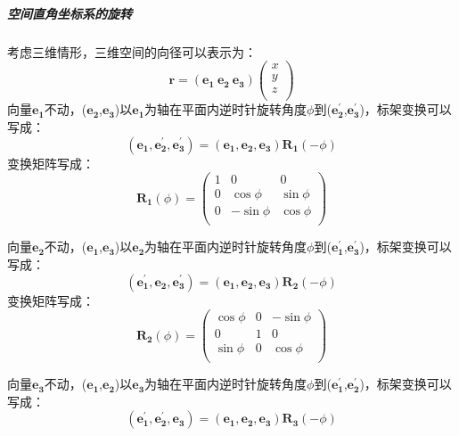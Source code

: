\subparagraph{空间直角坐标系的旋转}
考虑三维情形，三维空间的向径可以表示为：
\begin{equation}
	\boldsymbol{r}=(\boldsymbol{e_{1}} \ \boldsymbol{e_{2}} \ \boldsymbol{e_{3}})\begin{pmatrix}
		x\\
		y\\
		z\\
	\end{pmatrix}
\end{equation}
向量$\boldsymbol{e_{1}}$不动，($\boldsymbol{e_{2}}$,$\boldsymbol{e_{3}}$)以$\boldsymbol{e_{1}}$为轴在平面内逆时针旋转角度$\phi$到($\boldsymbol{e_{2}^\prime}$,$\boldsymbol{e_{3}^\prime}$)，标架变换可以写成：
\begin{equation}
	(\boldsymbol{e_{1}},\boldsymbol{e_{2}^\prime},\boldsymbol{e_{3}^\prime})=(\boldsymbol{e_{1}},\boldsymbol{e_{2}},\boldsymbol{e_{3}})\boldsymbol{R_{1}}(-\phi)
\end{equation}
变换矩阵写成：
\begin{equation}
	\boldsymbol{R_{1}}(\phi)=\begin{pmatrix}
		1&0&0\\
		0&\cos \phi &\sin \phi \\
		0&-\sin \phi &\cos \phi \\
	\end{pmatrix}
\end{equation}

向量$\boldsymbol{e_{2}}$不动，($\boldsymbol{e_{1}}$,$\boldsymbol{e_{3}}$)以$\boldsymbol{e_{2}}$为轴在平面内逆时针旋转角度$\phi$到($\boldsymbol{e_{1}^\prime}$,$\boldsymbol{e_{3}^\prime}$)，标架变换可以写成：
\begin{equation}
	(\boldsymbol{e_{1}^\prime},\boldsymbol{e_{2}},\boldsymbol{e_{3}^\prime})=(\boldsymbol{e_{1}},\boldsymbol{e_{2}},\boldsymbol{e_{3}})\boldsymbol{R_{2}}(-\phi)
\end{equation}
变换矩阵写成：
\begin{equation}
	\boldsymbol{R_{2}}(\phi)=\begin{pmatrix}
		\cos \phi &0&-\sin \phi \\
		0&1&0\\
		\sin \phi &0&\cos \phi \\
	\end{pmatrix}
\end{equation}

向量$\boldsymbol{e_{3}}$不动，($\boldsymbol{e_{1}}$,$\boldsymbol{e_{2}}$)以$\boldsymbol{e_{3}}$为轴在平面内逆时针旋转角度$\phi$到($\boldsymbol{e_{1}^\prime}$,$\boldsymbol{e_{2}^\prime}$)，标架变换可以写成：
\begin{equation}
	(\boldsymbol{e_{1}^\prime},\boldsymbol{e_{2}^\prime},\boldsymbol{e_{3}})=(\boldsymbol{e_{1}},\boldsymbol{e_{2}},\boldsymbol{e_{3}})\boldsymbol{R_{3}}(-\phi)
\end{equation}


